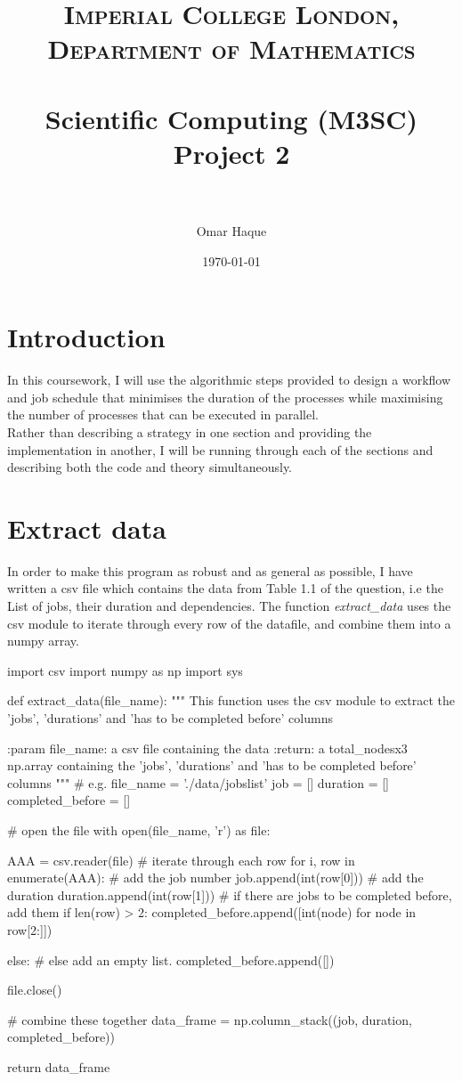 \documentclass[paper=a4, fontsize=12pt]{scrartcl} %
\title{
\normalfont \normalsize
\textsc{Imperial College London, Department of Mathematics} \\ [25pt]
\horrule{0.5pt} \\[0.4cm]                      %
\huge Scientific Computing (M3SC) Project 2 \\           %
\horrule{2pt} \\[0.5cm]                        %
}
\author{Omar Haque}
\date{\normalsize\today}
\numberwithin{equation}{section}       %
\numberwithin{figure}{section}         %
\numberwithin{table}{section}          %
\begin{document}

\maketitle

\section{Introduction}

In this coursework, I will use the algorithmic steps provided to design a workflow and job schedule that minimises the duration of the processes while maximising the number of processes that can be executed in parallel. \\
Rather than describing a strategy in one section and providing the implementation in another, I will be running through each of the sections and describing both the code and theory simultaneously. 
\section{Extract data}
In order to make this program as robust and as general as possible, I have written a csv file which contains the data from Table 1.1 of the question, i.e the List of jobs, their duration and dependencies.
The function \textit{extract\_data} uses the csv module to iterate through every row of the datafile, and combine them into a numpy array.

\begin{python} 
import csv
import numpy as np
import sys


def extract_data(file_name):
    """
    This function uses the csv module to extract the 'jobs', 'durations'
    and 'has to be completed before' columns

    :param file_name: a csv file containing the data
    :return: a total_nodesx3 np.array containing the 'jobs', 'durations'
    and 'has to be completed before' columns
    """
    # e.g. file_name = './data/jobslist'
    job = []
    duration = []
    completed_before = []

    # open the file
    with open(file_name, 'r') as file:

        AAA = csv.reader(file)
        # iterate through each row
        for i, row in enumerate(AAA):
            # add the job number
            job.append(int(row[0]))
            # add the duration
            duration.append(int(row[1]))
            # if there are jobs to be completed before, add them
            if len(row) > 2:
                completed_before.append([int(node) for node in row[2:]])

            else:
                # else add an empty list. 
                completed_before.append([])

    file.close()

    # combine these together
    data_frame = np.column_stack((job, duration, completed_before))

    return data_frame
    \end{python}
\end{document}
